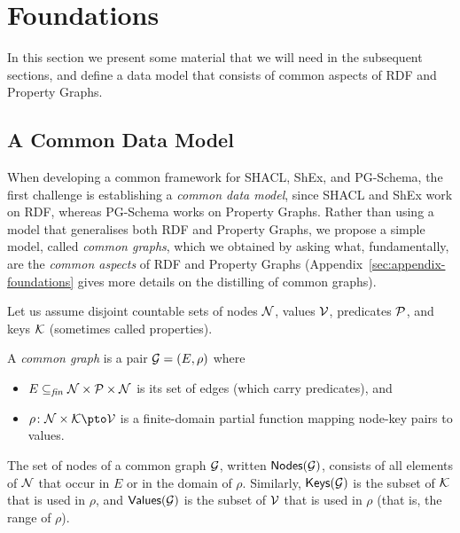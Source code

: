 

\section{Foundations}
\label{sec:prl}

In this section we present some material that we will need in the subsequent
sections, and define a data model that consists of common aspects of RDF and
Property Graphs.


\subsection{A Common Data Model}

When developing a common framework for SHACL, ShEx, and PG-Schema, the first
challenge is establishing  a \emph{common data model}, since SHACL and ShEx work
on RDF, whereas PG-Schema works on Property Graphs.
Rather than using a model that generalises  both RDF and Property Graphs, we
propose a simple model, called \emph{common graphs}, which we obtained by asking
what, fundamentally, are the \emph{common aspects} of RDF and Property Graphs
(Appendix~\ref{sec:appendix-foundations} gives more details on the distilling of
common graphs).

Let us assume disjoint countable sets of nodes $\mathcal{N}$, values $\mathcal{V}$,
predicates $\mathcal{P}$, and keys $\mathcal{K}$ (sometimes called properties).


\begin{definition}
  A \emph{common graph} is a pair $\mathcal{G} = (E, \rho)$ where
  \begin{itemize}[\textbullet]
  \item
    $E \subseteq_{\mathit{fin}} \mathcal{N} \times \mathcal{P} \times \mathcal{N}$ is its
    set of edges (which carry predicates), and
  \item
    $\rho \colon \Nodes \times \Keys \pto \Values$ is a finite-domain partial
    function mapping node-key pairs to values.
  \end{itemize}
  The set of nodes of a common graph $\mathcal{G}$, written $\mathsf{Nodes}(\mathcal{G})$,
  consists of all elements of $\mathcal{N}$ that occur in $E$ or in the domain of
  $\rho$.
  Similarly, $\mathsf{Keys}(\mathcal{G})$ is the subset of $\mathcal{K}$ that is used in $\rho$,
  and $\mathsf{Values}(\mathcal{G})$ is the subset of $\mathcal{V}$ that is used in $\rho$ (that
  is, the range of $\rho$).
\end{definition}

